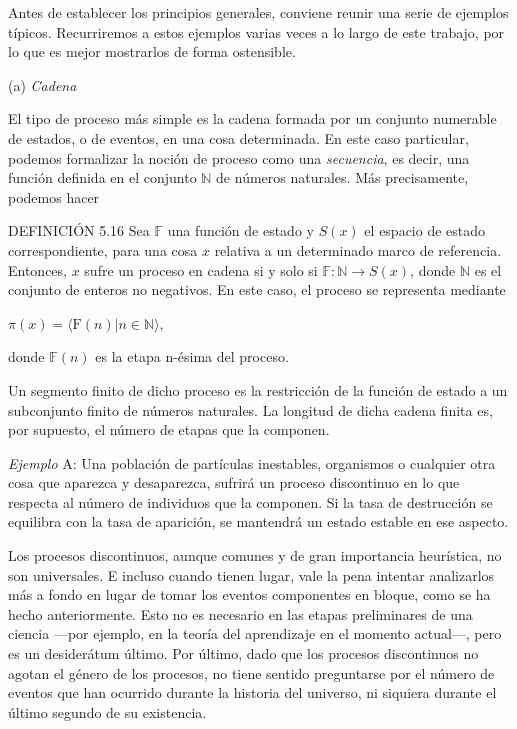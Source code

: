 \begin{justifying}
    Antes de establecer los principios generales, conviene reunir una serie de ejemplos típicos. Recurriremos a estos ejemplos varias veces a lo largo de este trabajo, por lo que es mejor mostrarlos de forma ostensible. 

    \bigskip
    \noindent(a) \textit{Cadena}
    \medskip

    \noindent El tipo de proceso más simple es la cadena formada por un conjunto numerable de estados, o de eventos, en una cosa determinada. En este caso particular, podemos formalizar la noción de proceso como una \textit{secuencia}, es decir, una función definida 
    en el conjunto $\mathbb{N}$ de números naturales. Más precisamente, podemos hacer

    \noindent DEFINICIÓN 5.16 Sea $\mathbb{F}$ una función de estado y $S(x)$ el espacio de estado correspondiente, para una cosa $x$ relativa a un determinado marco de referencia. Entonces, $x$ sufre un proceso en cadena si y solo si $\mathbb{F}:\mathbb{N}\to S(x)$, donde $\mathbb{N}$ 
    es el conjunto de enteros no negativos. En este caso, el proceso se representa mediante

    \indent\indent$\pi(x) = \langle \text{F}(n) | n \in \mathbb{N} \rangle,$
    
    \noindent donde $\mathbb{F}(n)$ es la etapa n-ésima del proceso.

    Un segmento finito de dicho proceso es la restricción de la función de estado a un subconjunto finito de números naturales. La longitud de dicha cadena finita es, por supuesto, el número de etapas que la componen.

    \textit{Ejemplo} A: Una población de partículas inestables, organismos o cualquier otra cosa que aparezca y desaparezca, sufrirá un proceso discontinuo en lo que respecta al número de individuos que la componen. Si la tasa de destrucción se equilibra con la tasa de aparición, se mantendrá un estado estable en ese aspecto.

    Los procesos discontinuos, aunque comunes y de gran importancia heurística, no son universales. E incluso cuando tienen lugar, vale la pena intentar analizarlos más a fondo en lugar de tomar los eventos componentes en bloque, como se ha hecho anteriormente. Esto 
    no es necesario en las etapas preliminares de una ciencia —por ejemplo, en la teoría del aprendizaje en el momento actual—, pero es un desiderátum último. Por último, dado que los procesos discontinuos no agotan el género de los procesos, no tiene sentido preguntarse 
    por el número de eventos que han ocurrido durante la historia del universo, ni siquiera durante el último segundo de su existencia.


\end{justifying}
